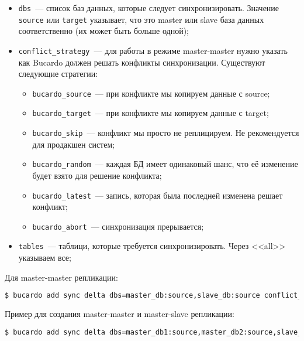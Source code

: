 \begin{itemize}
  \item \lstinline!dbs!~--- список баз данных, которые следует синхронизировать. Значение \lstinline!source! или \lstinline!target! указывает, что это master или slave база данных соответственно (их может быть больше одной);

  \item \lstinline!conflict_strategy!~--- для работы в режиме master-master нужно указать как Bucardo должен решать конфликты синхронизации. Существуют следующие стратегии:

  \begin{itemize}
    \item \lstinline!bucardo_source!~--- при конфликте мы копируем данные с source;
    \item \lstinline!bucardo_target!~--- при конфликте мы копируем данные с target;
    \item \lstinline!bucardo_skip!~--- конфликт мы просто не реплицируем. Не рекомендуется для продакшен систем;
    \item \lstinline!bucardo_random!~--- каждая БД имеет одинаковый шанс, что её изменение будет взято для решение конфликта;
    \item \lstinline!bucardo_latest!~--- запись, которая была последней изменена решает конфликт;
    \item \lstinline!bucardo_abort!~--- синхронизация прерывается;
  \end{itemize}

  \item \lstinline!tables!~--- таблици, которые требуется синхронизировать. Через <<all>> указываем все;
\end{itemize}

Для master-master репликации:

\begin{lstlisting}[language=Bash,label=lst:bucardo10,caption=Настройка репликации]
$ bucardo add sync delta dbs=master_db:source,slave_db:source conflict_strategy=bucardo_latest tables=all
\end{lstlisting}

Пример для создания master-master и master-slave репликации:

\begin{lstlisting}[language=Bash,label=lst:bucardo-master-slave1,caption=Настройка репликации]
$ bucardo add sync delta dbs=master_db1:source,master_db2:source,slave_db1:target,slave_db2:target conflict_strategy=bucardo_latest tables=all
\end{lstlisting}

